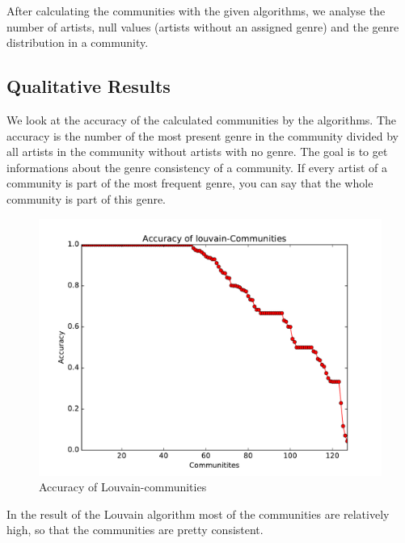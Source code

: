 \documentclass[11pt,a4paper,onecolumn,notitlepage]{article}
\begin{document}
After calculating the communities with the given algorithms, we analyse the number of artists, null values (artists without an assigned genre) and the genre distribution in a community.

\subsection{Qualitative Results}

We look at the accuracy of the calculated communities by the algorithms. The accuracy is the number of the most present genre in the community divided by all artists in the community without artists with no genre. The goal is to get informations about the genre consistency of a community. If every artist of a community is part of the most frequent genre, you can say that the whole community is part of this genre.

\begin{figure}[H]
\centering
\includegraphics[scale=0.4]{spotify_acc_louvain.pdf}
\caption{Accuracy of Louvain-communities}
\end{figure}

In the result of the Louvain algorithm most of the communities are relatively high, so that the communities are pretty consistent.
\end{document}
